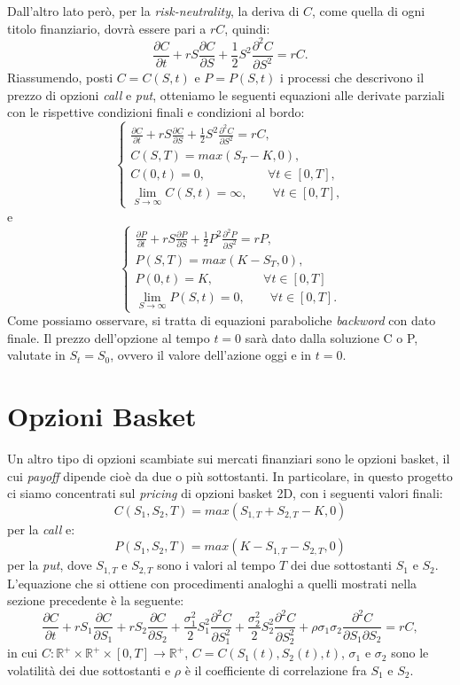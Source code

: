 \documentclass[a4paper,10pt]{report}
\newcommand{\der}[2]{\frac{\partial #1}{\partial #2}}
\newcommand{\dder}[2]{\frac{\partial^2 #1}{\partial #2^2}}
\newcommand{\dmix}[3]{\frac{\partial^2 #1}{\partial #2 \partial #3}}
\theoremstyle{osservazione}
\theoremstyle{esempio}
\theoremstyle{notazione}
\theoremstyle{corollario}
\begin{document}
Dall'altro lato per\`o, per la \emph{risk-neutrality}, la deriva di $C$, come quella di ogni titolo finanziario, dovr\`a essere pari a $rC$, quindi:$$\der{C}{t}+r S \der{C}{S} +\frac{1}{2}S^2\dder{C}{S}=rC.$$
Riassumendo, posti $C=C(S,t)$ e $P=P(S,t)$ i processi che descrivono il prezzo di opzioni \emph{call} e \emph{put}, otteniamo le seguenti equazioni alle derivate parziali con le rispettive condizioni finali e condizioni al bordo:
\begin{equation}
\begin{cases}
\displaystyle
\der{C}{t}+r S \der{C}{S} +\frac{1}{2}S^2\dder{C}{S}=rC,\\
C(S,T)=max(S_T-K,0),\\
C(0,t)=0,\qquad\quad\qquad\forall t\in[0,T],\\
\lim\limits_{S\to\infty}C(S,t)=\infty,\qquad\forall t\in[0,T],
\end{cases}
\label{callbs1d}
\end{equation}
e
\begin{equation}
\begin{cases}
\displaystyle
\der{P}{t}+r S \der{P}{S} +\frac{1}{2}P^2\dder{P}{S}=rP,\\
P(S,T)=max(K-S_T,0),\\
P(0,t)=K,\qquad\qquad\forall t\in[0,T]\\
\lim\limits_{S\to\infty}P(S,t)=0,\qquad\forall t\in[0,T].
\end{cases}
\label{putbs1d}
\end{equation}
Come possiamo osservare, si tratta di equazioni paraboliche \emph{backword} con dato finale. Il prezzo dell'opzione al tempo $t=0$ sar\`a dato dalla soluzione C o P, valutate in $S_t=S_0$, ovvero il valore dell'azione oggi e in $t=0$.

\section{Opzioni Basket}
Un altro tipo di opzioni scambiate sui mercati finanziari sono le opzioni basket, il cui \emph{payoff} dipende cio\`e da due o pi\`u sottostanti. In particolare, in questo progetto ci siamo concentrati sul \emph{pricing} di opzioni basket 2D, con i seguenti valori finali: $$C(S_1, S_2, T)=max(S_{1,T}+S_{2,T}-K,0)$$ per la \emph{call} e: $$P(S_1, S_2, T)=max(K-S_{1,T}-S_{2,T},0)$$ per la \emph{put}, dove $S_{1,T}$ e $S_{2,T}$ sono i valori al tempo $T$ dei due sottostanti $S_1$ e $S_2$.\\L'equazione che si ottiene con procedimenti analoghi a quelli mostrati nella sezione precedente \`e la seguente:
\begin{equation}
\der{C}{t}+rS_1\der{C}{S_1}+rS_2\der{C}{S_2}+\frac{\sigma^2_1}{2}S_1^2\dder{C}{S_1}+\frac{\sigma^2_2}{2}S_2^2\dder{C}{S_2}+\rho\sigma_1\sigma_2\dmix{C}{S_1}{S_2}=rC,
\label{pde2d}
\end{equation}
in cui $C:\mathbb{R}^+\times\mathbb{R}^+\times[0,T]\rightarrow\mathbb{R}^+$, $C=C(S_1(t), S_2(t),t)$, $\sigma_1$ e $\sigma_2$ sono le volatilit\`a dei due sottostanti e $\rho$ \`e il coefficiente di correlazione fra $S_1$ e $S_2$.
\end{document}
